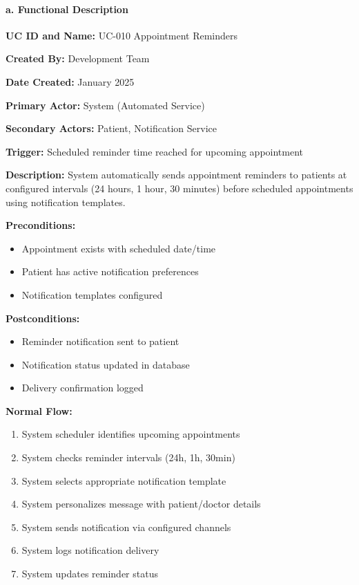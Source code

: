 \documentclass[12pt,a4paper]{article}
\begin{document}
\paragraph{a. Functional Description}

\textbf{UC ID and Name:} UC-010 Appointment Reminders

\textbf{Created By:} Development Team

\textbf{Date Created:} January 2025

\textbf{Primary Actor:} System (Automated Service)

\textbf{Secondary Actors:} Patient, Notification Service

\textbf{Trigger:} Scheduled reminder time reached for upcoming appointment

\textbf{Description:} System automatically sends appointment reminders to patients at configured intervals (24 hours, 1 hour, 30 minutes) before scheduled appointments using notification templates.

\textbf{Preconditions:}
\begin{itemize}
    \item Appointment exists with scheduled date/time
    \item Patient has active notification preferences
    \item Notification templates configured
\end{itemize}

\textbf{Postconditions:}
\begin{itemize}
    \item Reminder notification sent to patient
    \item Notification status updated in database
    \item Delivery confirmation logged
\end{itemize}

\textbf{Normal Flow:}
\begin{enumerate}
    \item System scheduler identifies upcoming appointments
    \item System checks reminder intervals (24h, 1h, 30min)
    \item System selects appropriate notification template
    \item System personalizes message with patient/doctor details
    \item System sends notification via configured channels
    \item System logs notification delivery
    \item System updates reminder status
\end{enumerate}
\end{document}
